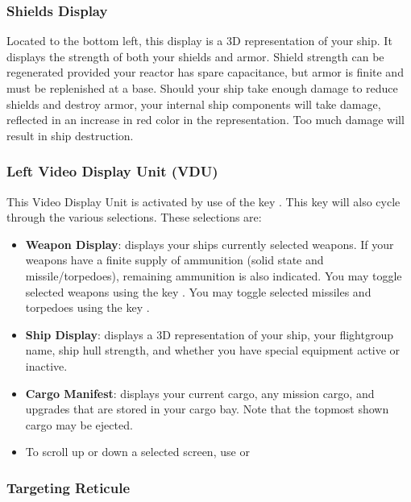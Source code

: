 \documentclass{article}
\newcommand{\key}[1]{%
  \tikz[baseline=(key.base)]{
    \node[draw=gray!50, fill=gray!5, rounded corners=2pt, inner sep=2pt, minimum height=1.5ex] (key) {\footnotesize\sffamily\bfseries #1};
  }%
}
\begin{document}
\subsubsection{Shields Display }

Located to the bottom left, this display is a 3D representation of your ship. It displays the strength of both your shields and armor. Shield strength can be regenerated provided your reactor has spare capacitance, but armor is finite and must be replenished at a base. Should your ship take enough damage to reduce shields and destroy armor, your internal ship components will take damage, reflected in an increase in red color in the representation. Too much damage will result in ship destruction. 

\subsubsection{Left Video Display Unit (VDU) }

This Video Display Unit is activated by use of the key \key{m}. This key will also cycle through the various selections. These selections are: 

\begin{itemize}
\item  \textbf{Weapon Display}: displays your ships currently selected weapons. If your weapons have a finite supply of ammunition (solid state and missile/torpedoes), remaining ammunition is also indicated. You may toggle selected weapons using the key \key{g}. You may toggle selected missiles and torpedoes using the key \key{w}. 

\item  \textbf{Ship Display}: displays a 3D representation of your ship, your flightgroup name, ship hull strength, and whether you have special equipment active or inactive.  

\item  \textbf{Cargo Manifest}: displays your current cargo, any mission cargo, and upgrades that are stored in your cargo bay. Note that the topmost shown cargo may be ejected.  

\item  To scroll up or down a selected screen, use \key{PGUP} or \key{PGDN}
\end{itemize}



\subsubsection{Targeting Reticule }
\end{document}
